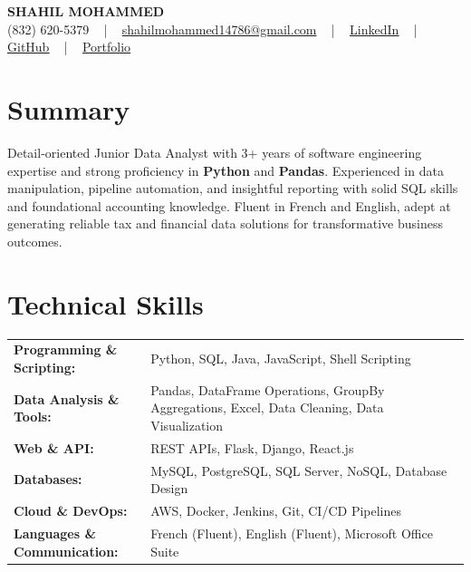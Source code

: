 \documentclass[letterpaper,11pt]{article}
\begin{document}
\begin{center}
    {\fontsize{14pt}{12pt}\selectfont \textbf{\MakeUppercase{Shahil Mohammed}}}\\ \vspace{2pt}
    \fontsize{10pt}{12pt}\selectfont (832) 620-5379 ~ | ~ \href{mailto:shahilmohammed14786@gmail.com}{shahilmohammed14786@gmail.com} ~ | ~  
    \href{https://www.linkedin.com/in/shahil-mohammed-9652931a1/}{\color{blue}\underline{LinkedIn}}  ~ | ~ 
    \href{https://github.com/freakbeast14}{\color{blue}\underline{GitHub}} ~ | ~ 
    \href{https://shahil-mohammed.netlify.app/}{\color{blue}\underline{Portfolio}}
    \vspace{-8pt}
\end{center}

\section{Summary}
\fontsize{9pt}{10pt}\selectfont
Detail-oriented Junior Data Analyst with 3+ years of software engineering expertise and strong proficiency in \textbf{Python} and \textbf{Pandas}. Experienced in data manipulation, pipeline automation, and insightful reporting with solid SQL skills and foundational accounting knowledge. Fluent in French and English, adept at generating reliable tax and financial data solutions for transformative business outcomes.
 \vspace{-5pt}
 
\section{Technical Skills}
        \vspace{-14pt}
        \begin{table}[h]
            \fontsize{9pt}{10pt}\selectfont
            \begin{tabular}{p{0.3\linewidth} p{0.7\linewidth}}
                \textbf{Programming \& Scripting:} & Python, SQL, Java, JavaScript, Shell Scripting \\
                \textbf{Data Analysis \& Tools:} & Pandas, DataFrame Operations, GroupBy Aggregations, Excel, Data Cleaning, Data Visualization \\
                \textbf{Web \& API:} & REST APIs, Flask, Django, React.js \\
                \textbf{Databases:} & MySQL, PostgreSQL, SQL Server, NoSQL, Database Design \\
                \textbf{Cloud \& DevOps:} & AWS, Docker, Jenkins, Git, CI/CD Pipelines \\
                \textbf{Languages \& Communication:} & French (Fluent), English (Fluent), Microsoft Office Suite \\
            \end{tabular}
        \end{table}
 \vspace{-15pt}
 
\end{document}
